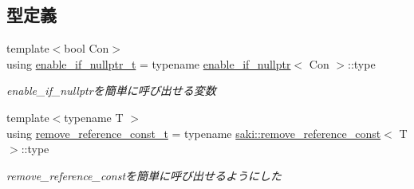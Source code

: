 \subsection*{型定義}
\begin{DoxyCompactItemize}
\item 
{\footnotesize template$<$bool Con$>$ }\\using \mbox{\hyperlink{namespacesaki_a4c362f5119aac94085eab0bf794facf7}{enable\+\_\+if\+\_\+nullptr\+\_\+t}} = typename \mbox{\hyperlink{structsaki_1_1enable__if__nullptr}{enable\+\_\+if\+\_\+nullptr}}$<$ Con $>$\+::type
\begin{DoxyCompactList}\small\item\em enable\+\_\+if\+\_\+nullptrを簡単に呼び出せる変数 \end{DoxyCompactList}\item 
{\footnotesize template$<$typename T $>$ }\\using \mbox{\hyperlink{namespacesaki_aff6964622fdfcdf489dab4b87727a8e4}{remove\+\_\+reference\+\_\+const\+\_\+t}} = typename \mbox{\hyperlink{structsaki_1_1remove__reference__const}{saki\+::remove\+\_\+reference\+\_\+const}}$<$ T $>$\+::type
\begin{DoxyCompactList}\small\item\em remove\+\_\+reference\+\_\+constを簡単に呼び出せるようにした \end{DoxyCompactList}\end{DoxyCompactItemize}
